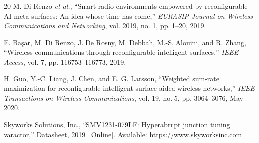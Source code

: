 \documentclass[12pt,a4paper]{article}
\begin{document}
\begin{thebibliography}{20}
M. Di Renzo \textit{et al.}, ``Smart radio environments empowered by reconfigurable AI meta-surfaces: An idea whose time has come,'' \textit{EURASIP Journal on Wireless Communications and Networking}, vol. 2019, no. 1, pp. 1--20, 2019.

E. Ba\c{s}ar, M. Di Renzo, J. De Rosny, M. Debbah, M.-S. Alouini, and R. Zhang, ``Wireless communications through reconfigurable intelligent surfaces,'' \textit{IEEE Access}, vol. 7, pp. 116753--116773, 2019.

H. Guo, Y.-C. Liang, J. Chen, and E. G. Larsson, ``Weighted sum-rate maximization for reconfigurable intelligent surface aided wireless networks,'' \textit{IEEE Transactions on Wireless Communications}, vol. 19, no. 5, pp. 3064--3076, May 2020.

Skyworks Solutions, Inc., ``SMV1231-079LF: Hyperabrupt junction tuning varactor,'' Datasheet, 2019. [Online]. Available: \url{https://www.skyworksinc.com}

\end{thebibliography}
\end{document}
